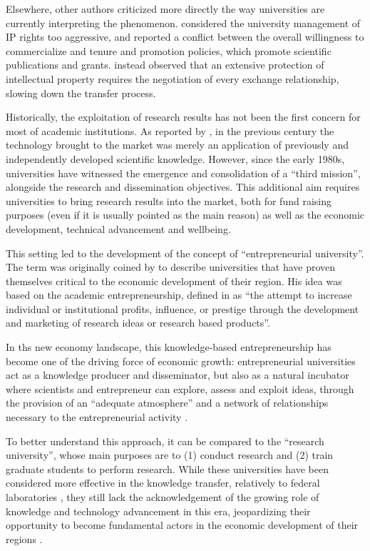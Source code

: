 Elsewhere, other authors criticized more directly the way universities are currently interpreting the phenomenon. \citet{Siegel2003a} considered the university management of IP rights too aggressive, and reported a conflict between the overall willingness to commercialize and tenure and promotion policies, which promote scientific publications and grants. \citet{Murray2005} instead observed that an extensive protection of intellectual property requires the negotiation of every exchange relationship, slowing down the transfer process.

Historically, the exploitation of research results has not been the first concern for most of academic institutions. As reported by \citet{Balconi2006}, in the previous century the technology brought to the market was merely an application of previously and independently developed scientific knowledge. However, since the early 1980s, universities have witnessed the emergence and consolidation of a \enquote{third mission}, alongside the research and dissemination objectives. This additional aim requires universities to bring research results into the market, both for fund raising purposes (even if it is usually pointed as the main reason) as well as the economic development, technical advancement and wellbeing. 

This setting led to the development of the concept of \enquote{entrepreneurial university}. The term was originally coined by \citet{Etzkowitz1998} to describe universities that have proven themselves critical to the economic development of their region. His idea was based on the academic entrepreneurship, defined in \citet{Louis1989} as \enquote{the attempt to increase individual or institutional profits, influence, or prestige through the development and marketing of research ideas or research based products}.

In ths new economy landscape, this knowledge-based entrepreneurship has become one of the driving force of economic growth: entrepreneurial universities act as a knowledge producer and disseminator, but also as a natural incubator where scientists and entrepreneur can explore, assess and exploit ideas, through the provision of an \enquote{adequate atmosphere} and a network of relationships necessary to the entrepreneurial activity \citep{Guerrero2014}.

To better understand this approach, it can be compared to the \enquote{research university}, whose main purposes are to (1) conduct research and (2) train graduate students to perform research. While these universities have been considered more effective in the knowledge transfer, relatively to federal laboratories \citep{Rogers2001}, they still lack the acknowledgement of the growing role of knowledge and technology advancement in this era, jeopardizing their opportunity to become fundamental actors in the economic development of their regions \citep{OShea2004}.

